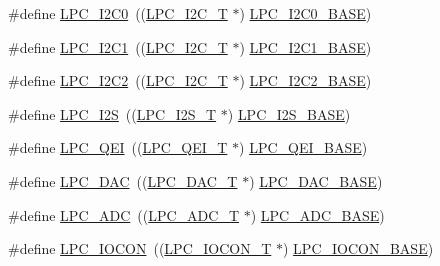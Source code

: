 \begin{DoxyCompactItemize}
\item 
\#define \hyperlink{group__PERIPH__407X__8X__BASE_ga14b6c56857e970a682a9bb22a0cb6716}{L\-P\-C\-\_\-\-I2\-C0}~((\hyperlink{structLPC__I2C__T}{L\-P\-C\-\_\-\-I2\-C\-\_\-\-T}              $\ast$) \hyperlink{group__PERIPH__407X__8X__BASE_gab4476c9e874621194369f74fcf26ce92}{L\-P\-C\-\_\-\-I2\-C0\-\_\-\-B\-A\-S\-E})
\item 
\#define \hyperlink{group__PERIPH__407X__8X__BASE_gad6d6333e47875813be171cffef258837}{L\-P\-C\-\_\-\-I2\-C1}~((\hyperlink{structLPC__I2C__T}{L\-P\-C\-\_\-\-I2\-C\-\_\-\-T}              $\ast$) \hyperlink{group__PERIPH__407X__8X__BASE_gae59f73cf24ff126be3b9a8b921926676}{L\-P\-C\-\_\-\-I2\-C1\-\_\-\-B\-A\-S\-E})
\item 
\#define \hyperlink{group__PERIPH__407X__8X__BASE_ga6bcdaa0ab66f4e3d213a488b34055557}{L\-P\-C\-\_\-\-I2\-C2}~((\hyperlink{structLPC__I2C__T}{L\-P\-C\-\_\-\-I2\-C\-\_\-\-T}              $\ast$) \hyperlink{group__PERIPH__407X__8X__BASE_ga00796bd1f1fa200bbffcd9e7e8679eaa}{L\-P\-C\-\_\-\-I2\-C2\-\_\-\-B\-A\-S\-E})
\item 
\#define \hyperlink{group__PERIPH__407X__8X__BASE_ga1d2800cab1a50bdf99efe66d6028b663}{L\-P\-C\-\_\-\-I2\-S}~((\hyperlink{structLPC__I2S__T}{L\-P\-C\-\_\-\-I2\-S\-\_\-\-T}              $\ast$) \hyperlink{group__PERIPH__407X__8X__BASE_gacff8b54e3924910d381e6b8ba804050c}{L\-P\-C\-\_\-\-I2\-S\-\_\-\-B\-A\-S\-E})
\item 
\#define \hyperlink{group__PERIPH__407X__8X__BASE_ga71347b58898f54f8e9f00a6c652c7d49}{L\-P\-C\-\_\-\-Q\-E\-I}~((\hyperlink{structLPC__QEI__T}{L\-P\-C\-\_\-\-Q\-E\-I\-\_\-\-T}              $\ast$) \hyperlink{group__PERIPH__407X__8X__BASE_ga80fa25b18324c10c8e5c26893e6f0a67}{L\-P\-C\-\_\-\-Q\-E\-I\-\_\-\-B\-A\-S\-E})
\item 
\#define \hyperlink{group__PERIPH__407X__8X__BASE_ga5b94918e9ea326d84ab862a5d377903b}{L\-P\-C\-\_\-\-D\-A\-C}~((\hyperlink{structLPC__DAC__T}{L\-P\-C\-\_\-\-D\-A\-C\-\_\-\-T}              $\ast$) \hyperlink{group__PERIPH__407X__8X__BASE_ga3bbaedad584252212d4704bb419489f6}{L\-P\-C\-\_\-\-D\-A\-C\-\_\-\-B\-A\-S\-E})
\item 
\#define \hyperlink{group__PERIPH__407X__8X__BASE_gab6eaf639d3a1eec83583a9e11ab7336f}{L\-P\-C\-\_\-\-A\-D\-C}~((\hyperlink{structLPC__ADC__T}{L\-P\-C\-\_\-\-A\-D\-C\-\_\-\-T}              $\ast$) \hyperlink{group__PERIPH__407X__8X__BASE_ga2396e0d0c565e4c1c3b2fc593bd6c37f}{L\-P\-C\-\_\-\-A\-D\-C\-\_\-\-B\-A\-S\-E})
\item 
\#define \hyperlink{group__PERIPH__407X__8X__BASE_gaabc651799ba17b0dd4a0114c8d48a145}{L\-P\-C\-\_\-\-I\-O\-C\-O\-N}~((\hyperlink{structLPC__IOCON__T}{L\-P\-C\-\_\-\-I\-O\-C\-O\-N\-\_\-\-T}            $\ast$) \hyperlink{group__PERIPH__407X__8X__BASE_gae48aea115d5924805263d7a15402d4fa}{L\-P\-C\-\_\-\-I\-O\-C\-O\-N\-\_\-\-B\-A\-S\-E})

\end{DoxyCompactItemize}
